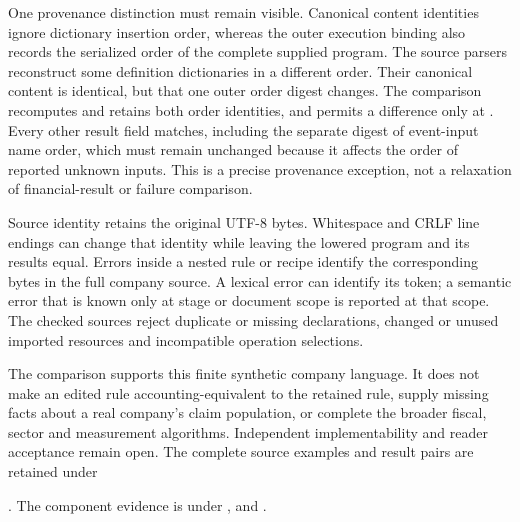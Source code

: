 One provenance distinction must remain visible. Canonical content identities
ignore dictionary insertion order, whereas the outer execution binding also
records the serialized order of the complete supplied program. The source
parsers reconstruct some definition dictionaries in a different order. Their
canonical content is identical, but that one outer order digest changes. The
comparison recomputes and retains both order identities, and permits a
difference only at . Every other result field
matches, including the separate digest of event-input name order, which must
remain unchanged because it affects the order of reported unknown inputs.
This is a precise provenance exception, not a relaxation of financial-result
or failure comparison.

Source identity retains the original UTF-8 bytes. Whitespace and CRLF line
endings can change that identity while leaving the lowered program and its
results equal. Errors inside a nested rule or recipe identify the corresponding
bytes in the full company source. A lexical error can identify its token; a
semantic error that is known only at stage or document scope is reported at
that scope. The checked sources reject duplicate or missing declarations,
changed or unused imported resources and incompatible operation selections.

The comparison supports this finite synthetic company language. It does not
make an edited rule accounting-equivalent to the retained rule, supply missing
facts about a real company's claim population, or complete the broader fiscal,
sector and measurement algorithms. Independent implementability and reader
acceptance remain open. The complete source examples and result pairs are
retained under
\begingroup\raggedright
{}.
The component evidence is under
,
and .
\par\endgroup
